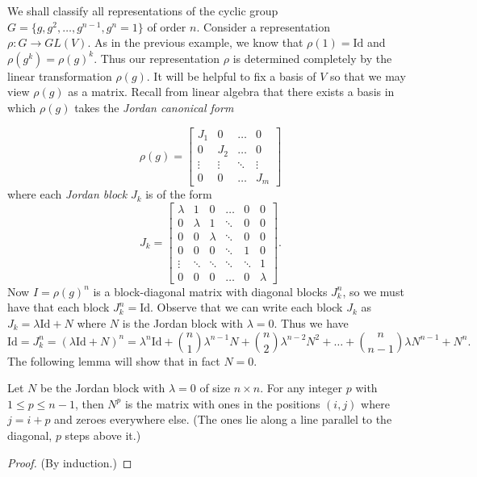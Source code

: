 \begin{example}
We shall classify all representations of the cyclic group $G = \{ g, g^2, \ldots, g^{n-1}, g^n=1\}$ of order $n$. Consider a representation $\rho \colon G \to GL(V)$.  As in the previous example, we know that $\rho(1) = \text{Id}$ and $\rho(g^k) = \rho(g)^k$.  Thus our representation $\rho$ is determined completely by the linear transformation $\rho(g)$.   It will be helpful to fix a basis of $V$ so that we may view $\rho(g)$ as a matrix.  Recall from linear algebra that there exists a basis in which $\rho(g)$ takes the \textit{Jordan canonical form}

\[ \rho(g) = \begin{bmatrix}
    J_1 & 0 & \dots  &0 \\
  0 & J_2  & \dots & 0 \\
    \vdots & \vdots  & \ddots & \vdots \\
    0& 0&  \dots  & J_m
\end{bmatrix} \]
where each \textit{Jordan block} $J_k$ is of the form 
\[J_k =  \begin{bmatrix}
    \lambda & 1&0& \dots  &0 & 0 \\
     0 &\lambda& 1& \ddots & 0  & 0 \\
     0 & 0 & \lambda & \ddots& 0  & 0 \\
     0 & 0 & 0 & \ddots & 1 & 0 \\
    \vdots & \ddots & \ddots & \ddots & \ddots  & 1\\
    0& 0& 0 & \dots  & 0  &\lambda
\end{bmatrix}. \]
Now $I = \rho(g)^n$ is a block-diagonal matrix with diagonal blocks $J_k^n$, so we must have that each block $J_k^n=\text{Id}$.  Observe that we can write each block $J_k$ as $J_k = \lambda \text{Id} + N$ where $N$ is the Jordan block with $\lambda = 0$.  Thus we have 
\[ \text{Id} = J_k^n = (\lambda \text{Id} + N)^n = \lambda ^n \text{Id} + \binom{n}{1} \lambda ^{n -1} N + \binom{n}{2} \lambda ^{n-2} N^2 + \ldots + \binom {n} {n -1} \lambda N^{n -1} + N^n. \] The following lemma will show that in fact $N=0$. 
\begin{lemma}
Let $N$ be the Jordan block with $\lambda = 0$ of size $n \times n$.  For any integer $p$ with $1 \leq p \leq n - 1$, then $N^p$ is the matrix with ones in the positions $(i,j)$ where $j = i + p$ and zeroes everywhere else.  (The ones lie along a line parallel to the diagonal, $p$ steps above it.)

\begin{proof}
(By induction.)


\end{proof}
\end{lemma}
\end{example}
